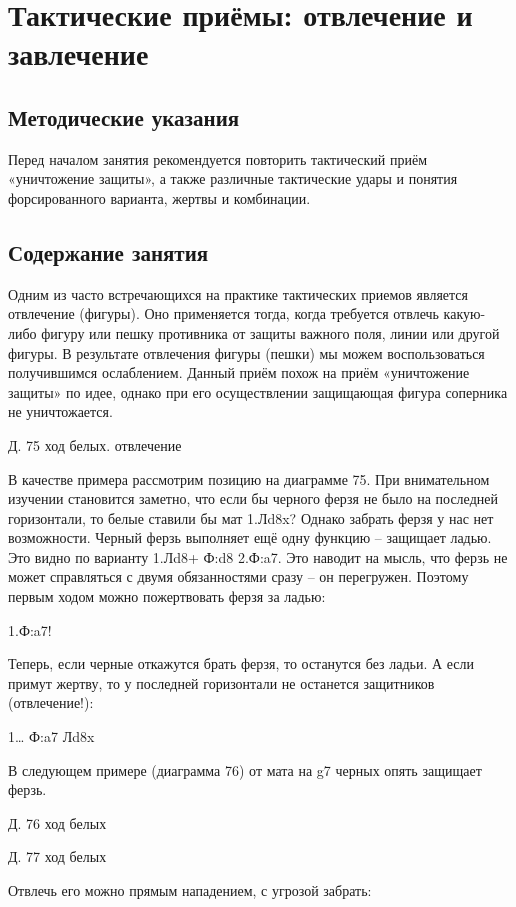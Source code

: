\chapter{Тактические приёмы: отвлечение и завлечение}

\section{Методические указания}

Перед началом занятия рекомендуется повторить тактический приём «уничтожение защиты», а также различные тактические удары и понятия форсированного варианта, жертвы и комбинации.

\section{Содержание занятия}

Одним из часто встречающихся на практике тактических приемов является отвлечение (фигуры). Оно применяется тогда, когда требуется отвлечь какую-либо фигуру или пешку противника от защиты важного поля, линии или другой фигуры. В результате отвлечения фигуры (пешки) мы можем воспользоваться получившимся ослаблением. Данный приём похож на приём «уничтожение защиты» по идее, однако при его осуществлении защищающая фигура соперника не уничтожается.
 
Д. 75 ход белых. отвлечение

В качестве примера рассмотрим позицию на диаграмме 75. При внимательном изучении становится заметно, что если бы черного ферзя не было на последней горизонтали, то белые ставили бы мат 1.Лd8x? Однако забрать ферзя у нас нет возможности. Черный ферзь выполняет ещё одну функцию – защищает ладью. Это видно по варианту 1.Лd8+ Ф:d8 2.Ф:a7. Это наводит на мысль, что ферзь не может справляться с двумя обязанностями сразу – он перегружен. Поэтому первым ходом можно пожертвовать ферзя за ладью:

1.Ф:a7!

Теперь, если черные откажутся брать ферзя, то останутся без ладьи. А если примут жертву, то у последней горизонтали не останется защитников (отвлечение!):

1… Ф:a7 Лd8x

В следующем примере (диаграмма 76) от мата на g7 черных опять защищает ферзь. 
 
 
Д. 76 ход белых
 
Д. 77 ход белых
 
Отвлечь его можно прямым нападением, с угрозой забрать:

